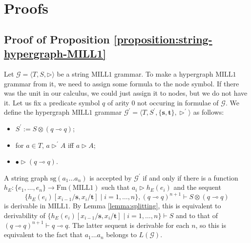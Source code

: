 \documentclass[a4paper,UKenglish,cleveref, autoref, thm-restate,pdfa]{lipics-v2021}
\newcommand{\eqdef}{:=}
\newcommand{\Gram}{\mathcal{G}}
\newcommand{\SG}{\mathrm{sg}}
\newcommand{\lt}{\mathbf{s}}
\newcommand{\rt}{\mathbf{t}}
\newcommand{\Fm}{\mathrm{Fm}}
\newcommand{\mconj}{\otimes}
\newcommand{\limpl}{\multimap}
\newcommand{\MILLFO}{\mathrm{MILL}1}
\begin{document}


\appendix


\newpage

\section{Proofs}


\subsection{Proof of Proposition \ref{proposition:string-hypergraph-MILL1}}\label{appendix:proof-proposition:string-hypergraph-MILL1}

Let $\Gram=\langle T, S, \triangleright \rangle$ be a string $\MILLFO$ grammar. To make a hypergraph $\MILLFO$ grammar from it, we need to assign some formula to the node symbol. If there was the unit in our calculus, we could just assign it to nodes, but we do not have it. Let us fix a predicate symbol $q$ of arity $0$ not occuring in formulae of $\Gram$. We define the hypergraph $\MILLFO$ grammar $\Gram^\prime = \langle T, S^\prime, \{\lt,\rt\},\triangleright^\prime \rangle$ as follows:
\begin{itemize}
	\item $S^\prime \eqdef S \mconj (q \limpl q)$;
	\item for $a \in T$, $a \triangleright^\prime A$ iff $a \triangleright A$;
	\item $\bullet \triangleright (q \limpl q)$.
\end{itemize}
A string graph $\SG(a_1\ldots a_n)$ is accepted by $\Gram^\prime$ if and only if there is a function $h_E:\{e_1,\ldots,e_n\} \to \Fm(\MILLFO)$ such that $a_i \triangleright h_E(e_i)$ and the sequent
$$
\{h_E(e_i)[x_{i-1}/\lt,x_i/\rt] \mid i=1,\ldots,n\}, (q \limpl q)^{n+1} \vdash S \mconj (q \limpl q)
$$ 
is derivable in $\MILLFO$. By Lemma \ref{lemma:splitting}, this is equivalent to derivability of $\{h_E(e_i)[x_{i-1}/\lt,x_i/\rt] \mid i=1,\ldots,n\} \vdash S $ and to that of $(q \limpl q)^{n+1} \vdash q \limpl q$. The latter sequent is derivable for each $n$, so this is equivalent to the fact that $a_1\ldots a_n$ belongs to $L(\Gram)$.
\end{document}
